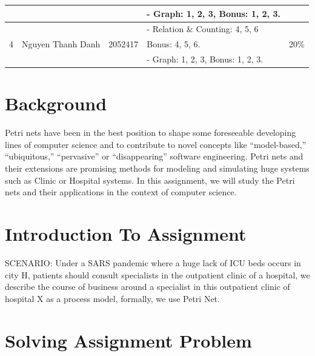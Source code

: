 \documentclass[a4paper]{article}
\begin{document}
\begin{center}
\begin{tabular}{|c|c|c|l|c|}
		                   &                                      &                          & - Graph: 1, 2, 3, Bonus: 1, 2, 3. &                             \\
		\hline
		\multirow{3}{*}{4} & \multirow{3}{*}{Nguyen Thanh Danh}   & \multirow{3}{*}{2052417} & - Relation \& Counting: 4, 5, 6   & \multirow{3}{*}{20\%}       \\
		                   &                                      &                          & Bonus: 4, 5, 6.                   &                             \\
		                   &                                      &                          & - Graph: 1, 2, 3, Bonus: 1, 2, 3. &                             \\
		\hline
	\end{tabular}
\end{center}
\newpage
\section{Background}
\indent Petri nets have been in the best position to shape some foreseeable developing lines of computer science and
to contribute to novel concepts like “model-based,” “ubiquitous,”
“pervasive” or “disappearing” software engineering. Petri nets and their extensions are promising methods for modeling and simulating
huge systems such as Clinic or Hospital systems. In this assignment, we will study the Petri nets and their applications in the context of computer science.
\section{Introduction To Assignment}
\par
SCENARIO: Under a SARS pandemic where a huge lack of ICU beds occurs in city H,
patients should consult specialists in the outpatient clinic of a hospital, we describe the
course of business around a specialist in this outpatient clinic of hospital X as a process
model, formally, we use Petri Net.\par
\section{Solving Assignment Problem}
\end{document}
